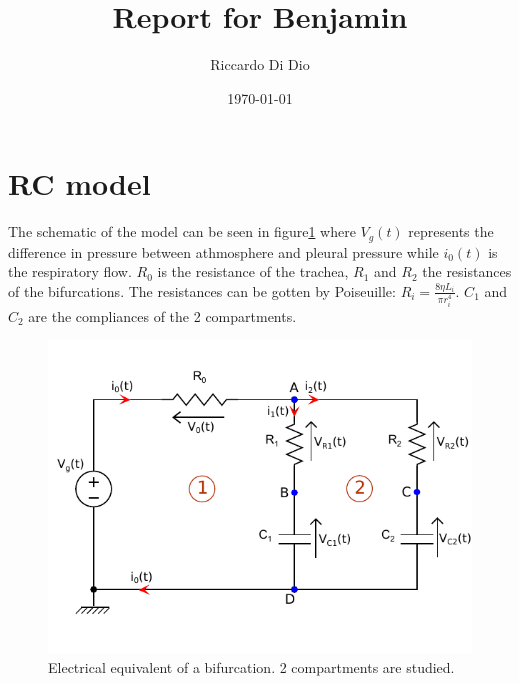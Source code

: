 \documentclass[11pt]{article}
\title{\vspace{-3.0cm}Report for Benjamin}
\author{Riccardo Di Dio}
\date{\today}
\begin{document}
\maketitle
\section{RC model}
The schematic of the model can be seen in figure\ref{fig:LungModelRC}
where $V_g(t)$ represents the difference in pressure between athmosphere and pleural pressure while $i_0(t)$ is the respiratory flow. $R_0$ is the resistance of the trachea, $R_1$ and $R_2$ the resistances of the bifurcations. The resistances can be  gotten by Poiseuille: $R_i = \frac{8\eta L_i}{\pi r_i^4}$. $C_1$ and $C_2$ are the compliances of the 2 compartments.
\begin{figure}[ht]
\label{fig:LungModelRC}
\centering
\includegraphics[scale=1.3]{LungModelRC.pdf}
\caption{Electrical equivalent of a bifurcation. 2 compartments are studied.}
\end{figure}
\end{document}
